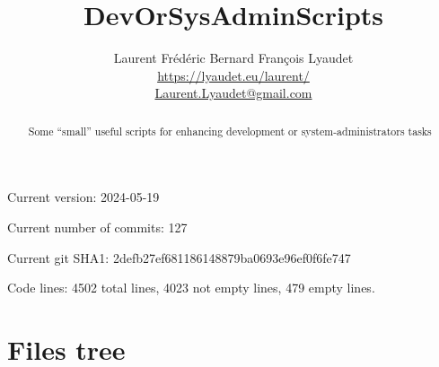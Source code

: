 \documentclass{article}
\begin{document}
\author{
  Laurent Frédéric Bernard François Lyaudet\\
  \url{https://lyaudet.eu/laurent/}\\
  \href{mailto:Laurent.Lyaudet@gmail.com}{Laurent.Lyaudet@gmail.com}
}
\title{DevOrSysAdminScripts}

\maketitle
\begin{abstract}
Some “small” useful scripts
for enhancing development or system-administrators tasks
\end{abstract}

Current version: 2024-05-19

Current number of commits: 127

Current git SHA1: 2defb27ef681186148879ba0693e96ef0f6fe747

Code lines: 4502 total lines, 4023 not empty lines, 479 empty lines.

\section{Files tree}
\label{section:tree}
\end{document}
